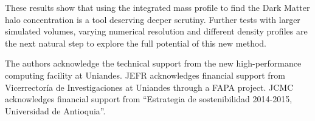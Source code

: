 \documentclass{emulateapj}
\begin{document}
These results show that using the integrated mass profile to find the
Dark Matter halo concentration is a tool deserving deeper scrutiny.   
Further tests with larger simulated volumes, varying numerical
resolution and different density profiles are the next natural step to
explore the full potential of this new method. 


\vspace{0.1cm}

 The authors acknowledge the technical support from the new
 high-performance computing facility at Uniandes. JEFR acknowledges
 financial support from Vicerrector\'ia de Investigaciones at Uniandes
 through a FAPA project. JCMC acknowledges financial support from
 ``Estrategia de  sostenibilidad 2014-2015, Universidad de
 Antioquia''.    


%
\end{document}
